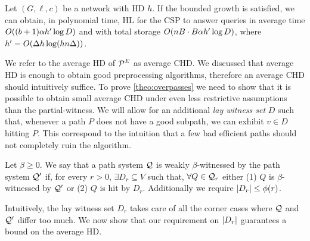 \begin{theorem}\label{theo:overpasses}
Let $(G,\ell,c)$ be a network with HD $h$.
If the bounded growth is satisfied, we can obtain, in polynomial time, HL for the CSP to answer queries in average time $O((b+1)\alpha h'\log D)$ and with total storage $O(nB\cdot B\alpha h'\log D)$, where $h'=O(\Delta h\log(hn\Delta))$.
\end{theorem}

We refer to the average HD of $\mathcal{P}^E$ as average CHD.
We discussed that average HD is enough to obtain good preprocessing algorithms, therefore an average CHD should intuitively suffice.
To prove \cref{theo:overpasses} we  need to show that it is possible to obtain small average CHD under even less restrictive assumptions than the partial-witness.
We will allow for an additional \emph{lay witness set} $D$ such that, whenever a path $P$ does not have a good subpath, we can exhibit $v\in D$ hitting $P$.
This correspond to the intuition that a few bad efficient paths should not completely ruin the algorithm. 

\begin{definition}
Let $\beta\geq 0$.
We say that a path system  $\mathcal{Q}$ is weakly $\beta$-witnessed by the path system $\mathcal{Q}'$ if, for every $r>0$, $\exists D_r\subseteq V$ such that, $\forall Q\in \mathcal{Q}_r$ either (1) $Q$ is $\beta$-witnessed by $\mathcal{Q}'$ or (2) $Q$ is hit by $D_r$.
Additionally we require $\lvert D_r\rvert\leq \phi(r)$.
\end{definition} 

Intuitively, the lay witness set $D_r$ takes care of all the corner cases where $\mathcal{Q}$ and $\mathcal{Q}'$ differ too much.
We now show that our requirement on $\lvert D_r\rvert$ guarantees a bound on the average HD.


